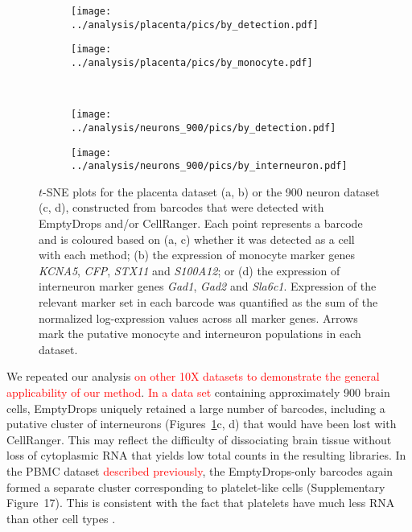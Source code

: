 \documentclass[10pt,letterpaper]{article}
\newcommand{\revised}[1]{\textcolor{red}{#1}}
\newcommand{\suppfigrealpbmc}{17}
\begin{document}
\begin{figure}[btp]
    \begin{subfigure}{0.49\textwidth}
        \texttt{[image: ../analysis/placenta/pics/by\_detection.pdf]}
        \caption{}
    \end{subfigure}
    \begin{subfigure}{0.49\textwidth}
        \texttt{[image: ../analysis/placenta/pics/by\_monocyte.pdf]}
        \caption{}
    \end{subfigure} \\[0.05in]
    \begin{subfigure}{0.49\textwidth}
        \texttt{[image: ../analysis/neurons\_900/pics/by\_detection.pdf]}
        \caption{}
    \end{subfigure}
    \begin{subfigure}{0.49\textwidth}
        \texttt{[image: ../analysis/neurons\_900/pics/by\_interneuron.pdf]}
        \caption{}
    \end{subfigure} 
    \caption{$t$-SNE plots for the placenta dataset (a, b) or the 900 neuron dataset (c, d), constructed from barcodes that were detected with EmptyDrops and/or CellRanger.
        Each point represents a barcode and is coloured based on (a, c) whether it was detected as a cell with each method;
        (b) the expression of monocyte marker genes \textit{KCNA5}, \textit{CFP}, \textit{STX11} and \textit{S100A12};
        or (d) the expression of interneuron marker genes \textit{Gad1}, \textit{Gad2} and \textit{Sla6c1}.
        Expression of the relevant marker set in each barcode was quantified as the sum of the normalized log-expression values across all marker genes.
        Arrows mark the putative monocyte and interneuron populations in each dataset.
    }
    \label{fig:realtsne}
\end{figure}

We repeated our analysis \revised{on other 10X datasets to demonstrate the general applicability of our method}.
\revised{In a data set} containing approximately 900 brain cells, EmptyDrops uniquely retained a large number of barcodes, including a putative cluster of interneurons (Figures~\ref{fig:realtsne}c, d) that would have been lost with CellRanger.
This may reflect the difficulty of dissociating brain tissue without loss of cytoplasmic RNA \cite{habib2017massively} that yields low total counts in the resulting libraries.
In the PBMC dataset \revised{described previously}, the EmptyDrops-only barcodes again formed a separate cluster corresponding to platelet-like cells (Supplementary Figure~\suppfigrealpbmc{}).
This is consistent with the fact that platelets have much less RNA than other cell types \cite{rowley2012platelet}.
\end{document}
